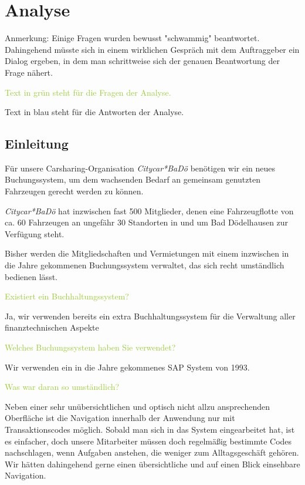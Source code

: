 
\chapter{Analyse}

Anmerkung: Einige Fragen wurden bewusst "schwammig" beantwortet. Dahingehend müsste sich in einem wirklichen Gespräch mit dem Auftraggeber ein Dialog ergeben, in dem man schrittweise sich der genauen Beantwortung der Frage nähert. 

\textcolor{YellowGreen}{Text in grün steht für die Fragen der Analyse.}

\textcolor{NavyBlue}{Text in blau steht für die Antworten der Analyse.}

\section{Einleitung}

Für unsere Carsharing-Organisation \emph{Citycar*BaDö} benötigen wir ein neues Buchungssystem, um dem wachsenden Bedarf an gemeinsam genutzten Fahrzeugen gerecht werden zu können. 

\emph{Citycar*BaDö} hat inzwischen fast 500 Mitglieder, denen eine Fahrzeugflotte von ca. 60 Fahrzeugen an ungefähr 30 Standorten in und um Bad Dödelhausen zur Verfügung steht. 

Bisher werden die Mitgliedschaften und Vermietungen mit einem inzwischen in die Jahre gekommenen Buchungssystem verwaltet, das sich recht umständlich bedienen lässt. 

\textcolor{YellowGreen}{Existiert ein Buchhaltungssystem?}

\textcolor{NavyBlue}{Ja, wir verwenden bereits ein extra Buchhaltungssystem für die Verwaltung aller finanztechnischen Aspekte}

\textcolor{YellowGreen}{Welches Buchungssystem haben Sie verwendet?}

\textcolor{NavyBlue}{Wir verwenden ein in die Jahre gekommenes SAP System von 1993.}

\textcolor{YellowGreen}{Was war daran so umständlich?}

\textcolor{NavyBlue}{Neben einer sehr unübersichtlichen und optisch nicht allzu ansprechenden Oberfläche ist die Navigation innerhalb der Anwendung nur mit Transaktionscodes möglich. Sobald man sich in das System eingearbeitet hat, ist es einfacher, doch unsere Mitarbeiter müssen doch regelmäßig bestimmte Codes nachschlagen, wenn Aufgaben anstehen, die weniger zum Alltagsgeschäft gehören. Wir hätten dahingehend gerne einen übersichtliche und auf einen Blick einsehbare Navigation.}

